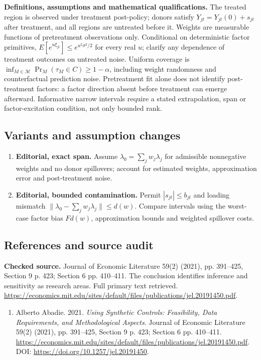 \documentclass[11pt,a4paper]{article}
\begin{document}
\textbf{Definitions, assumptions and mathematical qualifications.} The treated region is observed under treatment post-policy; donors satisfy \(Y_{jt}=Y_{jt}(0)+s_{jt}\) after treatment, and all regions are untreated before it. Weights are measurable functions of pretreatment observations only. Conditional on deterministic factor primitives, \(E[e^{u\xi_{jt}}]\leq e^{u^2\sigma^2/2}\) for every real \(u\); clarify any dependence of treatment outcomes on untreated noise. Uniform coverage is \(\inf_{M\in\mathcal M}\Pr_M(\tau_M\in C)\geq1-\alpha\), including weight randomness and counterfactual prediction noise. Pretreatment fit alone does not identify post-treatment factors: a factor direction absent before treatment can emerge afterward. Informative narrow intervals require a stated extrapolation, span or factor-excitation condition, not only bounded rank.
\subsection*{Variants and assumption changes}
\begin{enumerate}
\item \textbf{Editorial, exact span.} Assume \(\lambda_0=\sum_jw_j\lambda_j\) for admissible nonnegative weights and no donor spillovers; account for estimated weights, approximation error and post-treatment noise.
\item \textbf{Editorial, bounded contamination.} Permit \(|s_{jt}|\leq b_{jt}\) and loading mismatch \(\|\lambda_0-\sum_jw_j\lambda_j\|\leq d(w)\). Compare intervals using the worst-case factor bias \(F d(w)\), approximation bounds and weighted spillover costs.
\end{enumerate}
\subsection*{References and source audit}
\textbf{Checked source.} Journal of Economic Literature 59(2) (2021), pp. 391--425, Section 9 p. 423; Section 6 pp. 410--411. The conclusion identifies inference and sensitivity as research areas. Full primary text retrieved. \url{https://economics.mit.edu/sites/default/files/publications/jel.20191450.pdf}.
\begin{enumerate}\raggedright
\item\hypertarget{definitions:source:30007707:1}{} Alberto Abadie. 2021. \emph{Using Synthetic Controls: Feasibility, Data Requirements, and Methodological Aspects}. Journal of Economic Literature 59(2) (2021), pp. 391--425, Section 9 p. 423; Section 6 pp. 410--411.
\url{https://economics.mit.edu/sites/default/files/publications/jel.20191450.pdf}.
DOI: \url{https://doi.org/10.1257/jel.20191450}.
\end{enumerate}
\end{document}
